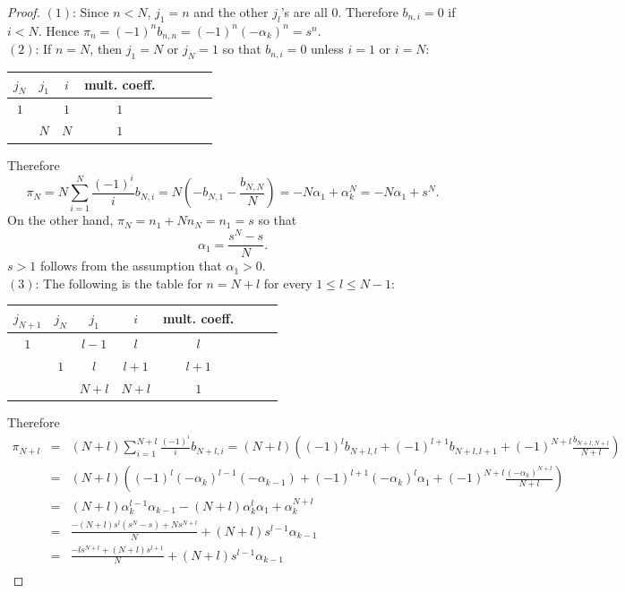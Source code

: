 \documentclass[reqno]{amsart}
\numberwithin{equation}{section}
\theoremstyle{plain}
\theoremstyle{definition}
\begin{document}
\begin{proof}
$(1)$: Since $n<N$, $j_1=n$ and the other $j_l$'s are all $0$. Therefore $b_{n, i}=0$ if $i<N$. Hence  $\pi_n=(-1)^nb_{n, n}=(-1)^n(-\alpha_k)^n=s^n$.\\
$(2)$: If $n=N$, then $j_1=N$ or $j_N=1$ so that $b_{n, i}=0$ unless $i=1$ or $i=N$:
\begin{center}
\begin{tabular}{ |c|c|c|c|c|c|c|c| }
\hline
    $j_{N}$ & $j_1$ & $i$ & mult. coeff.\\
\hline
   $1$ &  & $1$ & $1$\\ 
\hline
      & $N$ & $N$ & $1$\\ 
\hline
\end{tabular}
\end{center}  
Therefore 
$$\pi_N=N\sum^N_{i=1}\frac{(-1)^i}{i}
b_{N, i}=N\left(-b_{N, 1}-\frac{b_{N, N}}{N}\right)=-N\alpha_1+\alpha_k^N=-N\alpha_1+s^N.$$
On the other hand, $\pi_N=n_1+Nn_N=n_1=s$ so that 
$$\alpha_1=\frac{s^N-s}{N}.$$
$s>1$ follows from the assumption that $\alpha_1>0$.\\

$(3)$: The following is the table for $n=N+l$ for every $1\leq l\leq N-1$:
\begin{center}
\begin{tabular}{ |c|c|c|c|c|c|c|c| }
\hline
  $j_{N+1}$ & $j_{N}$ & $j_1$ & $i$ & mult. coeff.\\
\hline
 $1$ & & $l-1$ & $l$ & $l$\\ 
\hline
    & $1$  & $l$ & $l+1$ & $l+1$\\ 
\hline
   &  & $N+l$ & $N+l$ & $1$\\ 
\hline
\end{tabular}
\end{center}  

Therefore 
\begin{eqnarray*}
    \pi_{N+l}&=&(N+l)\sum^{N+l}_{i=1}\frac{(-1)^i}{i}
b_{N+l, i}=(N+l)\left((-1)^lb_{N+l, l}+(-1)^{l+1}b_{N+l, l+1}+(-1)^{N+l}\frac{b_{N+l, N+l}}{N+l}\right)\\
    &=&(N+l)\left((-1)^l(-\alpha_k)^{l-1}(-\alpha_{k-1})+(-1)^{l+1}(-\alpha_k)^l\alpha_1+(-1)^{N+l}\frac{(-\alpha_k)^{N+l}}{N+l}\right)\\
    &=&(N+l)\alpha_k^{l-1}\alpha_{k-1}-(N+l)\alpha_k^l\alpha_1+\alpha_k^{N+l}\\
    &=&\frac{-(N+l)s^l(s^N-s)+Ns^{N+l}}{N}+(N+l)s^{l-1}\alpha_{k-1}\\
    &=&\frac{-ls^{N+l}+(N+l)s^{l+1}}{N}+(N+l)s^{l-1}\alpha_{k-1}\\
\end{eqnarray*}


\end{proof}
\end{document}
